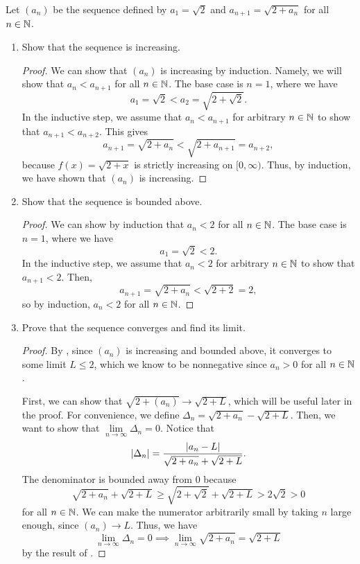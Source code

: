 \begin{problem}
  Let $(a_{n})$ be the sequence defined by $a_{1} = \sqrt{2}$ and $a_{n+1} = \sqrt{2 + a_{n}}$ for all $n \in \mathbb{N}$.

  \begin{enumerate}[label=(\alph*)]
    \item Show that the sequence is increasing.
      
      \begin{proof}
        We can show that $(a_{n})$ is increasing by induction. Namely, we will show
        that $a_{n} < a_{n+1}$ for all $n \in \mathbb{N}$. The base case is $n = 1$, where we have
        \[
          a_{1} = \sqrt{2} < a_{2} = \sqrt{2 + \sqrt{2}}.
        \] 
        In the inductive step, we assume that $a_{n} < a_{n+1}$ for arbitrary $n \in \mathbb{N}$ to show
        that $a_{n+1} < a_{n+2}$. This gives
        \[
          a_{n+1} = \sqrt{2 + a_{n}} < \sqrt{2 + a_{n+1}} = a_{n+2},
        \]
      because $f(x) = \sqrt{2 + x}$ is strictly increasing on $[0, \infty)$. Thus, by induction, we have shown that $(a_{n})$ is increasing.
      \end{proof}

    \item Show that the sequence is bounded above.

      \begin{proof}
        We can show by induction that $a_{n} < 2$ for all $n \in \mathbb{N}$. The base case is $n = 1$, where we have
        \[
          a_{1} = \sqrt{2} < 2.
        \]
        In the inductive step, we assume that $a_{n} < 2$ for arbitrary $n \in \mathbb{N}$ to show that $a_{n+1} < 2$. Then,
        \[
          a_{n+1} = \sqrt{2 + a_{n}} < \sqrt{2 + 2} = 2,
        \]
        so by induction, $a_{n} < 2$ for all $n \in \mathbb{N}$.
      \end{proof}

    \item Prove that the sequence converges and find its limit. 

      \begin{proof}
        By , since $(a_{n})$ is increasing and bounded above, it converges to some limit $L \leq 2$,
        which we know to be nonnegative since $a_{n} > 0$ for all $n \in \mathbb{N}$.

        First, we can show that $\sqrt{2 + (a_{n})} \to \sqrt{2 + L}$, which will be useful later in the proof.
        For convenience, we define $\Delta_{n} = \sqrt{2 + a_{n}} - \sqrt{2 + L}$. Then, we want to show
        that $\lim\limits_{n \to \infty} \Delta_{n} = 0$. Notice that
        \[
          \left\lvert \Delta_{n} \right\rvert = \frac{\left\lvert a_{n} - L \right\rvert}{\sqrt{2 + a_{n}} + \sqrt{2 + L}}.
        \]
        The denominator is bounded away from $0$ because
        \[
          \sqrt{2 + a_{n}} + \sqrt{2 + L} \geq \sqrt{2 + \sqrt{2}} + \sqrt{2 + L} > 2\sqrt{2} > 0 
        \]
        for all $n \in \mathbb{N}$. We can make the numerator arbitrarily small by taking $n$ large enough, since $(a_{n}) \to L$. Thus, we have
        \[
          \lim_{n \to \infty} \Delta_{n} = 0 \implies \lim_{n \to \infty} \sqrt{2 + a_{n}} = \sqrt{2 + L}
        \]
        by the result of .


\end{proof}
\end{enumerate}
\end{problem}
